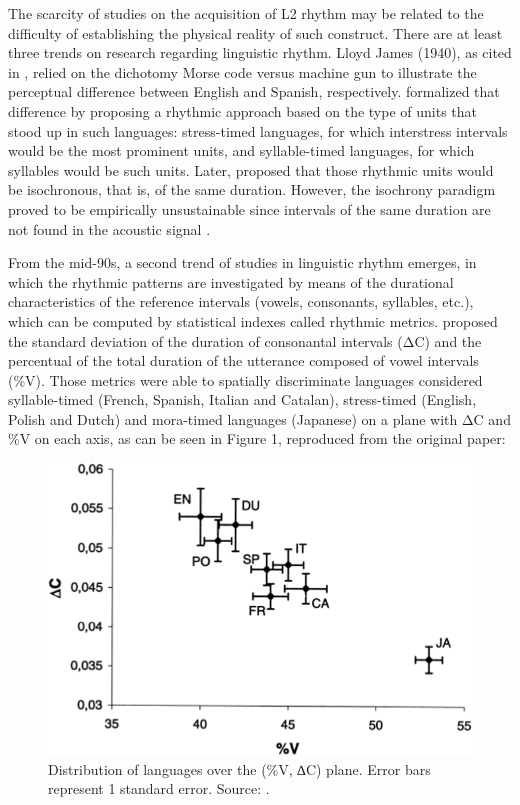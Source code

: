 The scarcity of studies on the acquisition of L2 rhythm may be related to the
difficulty of establishing the physical reality of such construct. There are at
least three trends on research regarding linguistic rhythm. Lloyd James (1940),
as cited in \citet{abercrombie1971}, relied on the dichotomy Morse code versus
machine gun to illustrate the perceptual difference between English and
Spanish, respectively. \citet{pike1945} formalized that difference by proposing a
rhythmic approach based on the type of units that stood up in such languages:
stress-timed languages, for which interstress intervals would be the most
prominent units, and syllable-timed languages, for which syllables would be
such units. Later, \citet{abercrombie1971} proposed that those rhythmic units would
be isochronous, that is, of the same duration. However, the isochrony paradigm
proved to be empirically unsustainable since intervals of the same duration are
not found in the acoustic signal \citep{cumming2010}.

From the mid-90s, a second trend of studies in linguistic rhythm emerges, in
which the rhythmic patterns are investigated by means of the durational
characteristics of the reference intervals (vowels, consonants, syllables,
etc.), which can be computed by statistical indexes called rhythmic metrics.
\citet{ramus1999} proposed the standard deviation of the duration
of consonantal intervals (ΔC) and the percentual of the total duration of the
utterance composed of vowel intervals (\%V). Those metrics were able to
spatially discriminate languages considered syllable-timed (French, Spanish,
Italian and Catalan), stress-timed (English, Polish and Dutch) and mora-timed
languages (Japanese) \citep{ladefoged1975} on a plane with ΔC and \%V on each axis,
as can be seen in Figure 1, reproduced from the original paper:

\begin{figure}
\centering
\includegraphics[width=0.9\linewidth]{imgs/leo-fig01.png}
\caption{Distribution of languages over the (\%V, ∆C) plane. Error bars
represent 1 standard error. Source: \citet[p.~273]{ramus1999}.}
\label{leo-fig01}
\end{figure}

